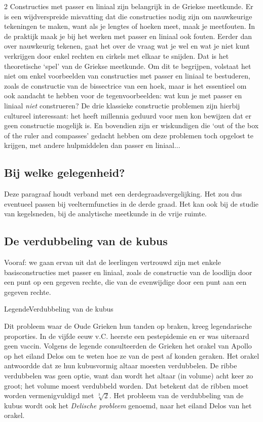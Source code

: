 \begin{multicols}{2}
	Constructies met passer en liniaal zijn belangrijk in de Griekse meetkunde. Er is een wijdverspreide misvatting dat die constructies nodig zijn om nauwkeurige tekeningen te maken, want als je lengtes of hoeken meet, maak je meetfouten. In de praktijk maak je bij het werken met passer en liniaal ook fouten. Eerder dan over nauwkeurig tekenen, gaat het over de vraag wat je wel en wat je niet kunt verkrijgen door enkel rechten en cirkels met elkaar te snijden. Dat is het theoretische `spel' van de Griekse meetkunde. Om dit te begrijpen, volstaat het niet om enkel voorbeelden van constructies met passer en liniaal te bestuderen, zoals de constructie van de bissectrice van een hoek, maar is het essentieel om ook aandacht te hebben voor de tegenvoorbeelden: wat kun je met passer en liniaal \emph{niet} construeren? De drie klassieke constructie problemen zijn hierbij cultureel interessant: het heeft millennia geduurd voor men kon bewijzen dat er geen constructie mogelijk is. En bovendien zijn er wiskundigen die `out of the box of the ruler and compasses' gedacht hebben om deze problemen toch opgelost te krijgen, met andere hulpmiddelen dan passer en liniaal...
	
	\subsection*{Bij welke gelegenheid?}
	
	Deze paragraaf houdt verband met een derdegraadsvergelijking. Het zou dus eventueel passen bij veeltermfuncties in de derde graad. Het kan ook bij de studie van kegelsneden, bij de analytische meetkunde in de vrije ruimte.
	
	\subsection*{De verdubbeling van de kubus}
	
	Vooraf: we gaan ervan uit dat de leerlingen vertrouwd zijn met enkele basisconstructies met passer en liniaal, zoals de constructie van de loodlijn door een punt op een gegeven rechte, die van de evenwijdige door een punt aan een gegeven rechte.
	\clearpage
	
	\begin{kader}{Legende}{Verdubbeling van de kubus}
		
		Dit probleem waar de Oude Grieken hun tanden op braken, kreeg legendarische proporties. In de vijfde eeuw v.C. heerste een pestepidemie en er was uiteraard geen vaccin. Volgens de legende consulteerden de Grieken het orakel van Apollo op het eiland Delos om te weten hoe ze van de pest af konden geraken. Het orakel antwoordde dat ze hun kubusvormig altaar moesten verdubbelen. De ribbe verdubbelen was geen optie, want dan wordt het altaar (in volume) acht keer zo groot; het volume moest verdubbeld worden. Dat betekent dat de ribben moet worden vermenigvuldigd met $\sqrt[3]{2}$. Het probleem van de verdubbeling van de kubus wordt ook het \emph{Delische probleem} genoemd, naar het eiland Delos van het orakel.
		

\end{kader}
\end{multicols}
